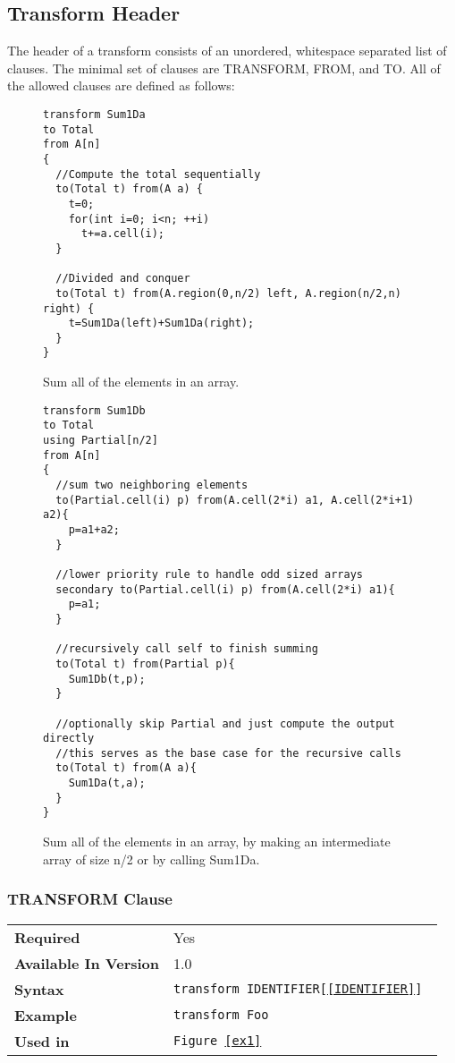 \documentclass[11pt]{article}
\begin{document}
\subsection{Transform Header}
\label{sec:transform}

The header of a transform consists of an unordered, whitespace separated
list of clauses.  The minimal set of clauses are TRANSFORM, FROM, and TO.
All of the allowed clauses are defined as follows:

\begin{figure}[h]
\begin{lstlisting}
transform Sum1Da
to Total
from A[n]
{
  //Compute the total sequentially
  to(Total t) from(A a) {
    t=0;
    for(int i=0; i<n; ++i)
      t+=a.cell(i); 
  }
  
  //Divided and conquer
  to(Total t) from(A.region(0,n/2) left, A.region(n/2,n) right) {
    t=Sum1Da(left)+Sum1Da(right);
  }
}
\end{lstlisting}
  \caption{
  Sum all of the elements in an array.
  \label{ex2}
  }
\end{figure}

\begin{figure}[h]
\begin{lstlisting}
transform Sum1Db
to Total
using Partial[n/2]
from A[n]
{
  //sum two neighboring elements
  to(Partial.cell(i) p) from(A.cell(2*i) a1, A.cell(2*i+1) a2){
    p=a1+a2;
  }

  //lower priority rule to handle odd sized arrays
  secondary to(Partial.cell(i) p) from(A.cell(2*i) a1){
    p=a1;
  }

  //recursively call self to finish summing
  to(Total t) from(Partial p){
    Sum1Db(t,p);
  }

  //optionally skip Partial and just compute the output directly
  //this serves as the base case for the recursive calls
  to(Total t) from(A a){
    Sum1Da(t,a);
  }
}
\end{lstlisting}
  \caption{
  Sum all of the elements in an array, by making an intermediate array of size n/2 or by calling Sum1Da.
  \label{ex3}
  }
\end{figure}

\subsubsection{TRANSFORM Clause}

\begin{tabular}{| l | l |}
\hline
\bf Required & Yes                    \\
\bf Available In Version & 1.0        \\
\bf Syntax & \tt transform IDENTIFIER[\ref{IDENTIFIER}] \\
\bf Example & \tt transform Foo       \\
\bf Used in & \tt Figure~\ref{ex1}      \\
\hline
\end{tabular}
\end{document}
